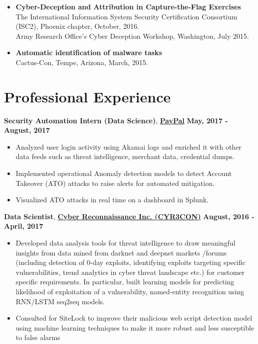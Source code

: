 \documentclass[margin,line]{CV}
\begin{document}
\begin{resume}
\begin{itemize}[leftmargin =*]
\item {\bf Cyber-Deception and Attribution in Capture-the-Flag Exercises}\\
The International Information System Security Certification Consortium (ISC2), Phoenix chapter, October, 2016.\\
Army Research Office's Cyber Deception Workshop, Washington, July 2015.

\item {\bf Automatic identification of malware tasks}\\
Cactus-Con, Tempe, Arizona, March, 2015.
\end{itemize}


\section{\sc Professional Experience}
{\bf Security Automation Intern (Data Science)}, \href{https://www.paypal.com/us/home}{\bf PayPal}  \hfill {\bf May, 2017 - August, 2017}
\begin{itemize}
    \item Analyzed user login activity using Akamai logs and enriched it with other data feeds such as threat intelligence, merchant data, credential dumps.
	\item Implemented operational Anomaly detection models to detect Account Takeover (ATO) attacks to raise alerts for automated mitigation.  
	\item Visualized ATO attacks in real time on a dashboard in Splunk.
	
\end{itemize}


{\bf Data Scientist}, \href{http://www.cyr3con.com/}{\bf Cyber Reconnaissance Inc. (CYR3CON)}  \hfill {\bf August, 2016 - April, 2017}
\begin{itemize}
	 \item Developed data analysis tools for threat intelligence to draw meaningful insights from data
	 mined from darknet and deepnet markets /forums (including detection of 0-day exploits, identifying
	 exploits targeting specific vulnerabilities, trend analytics in cyber threat landscape etc.)
	 for customer specific requirements. In particular, built learning models for predicting likelihood of exploitation of a vulnerability,  named-entity recognition using RNN/LSTM seq2seq models.
	 
	 \item Consulted for SiteLock to improve their malicious web script detection model using machine learning techniques to make it more robust and less susceptible to false alarms
\end{itemize}


\end{resume}
\end{document}
